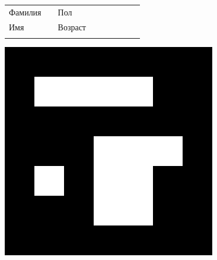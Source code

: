 \documentclass[12pt, a4paper]{article}
\begin{document}

\renewcommand{\arraystretch}{1.5}

\begin{figure}[t]
\scriptsize 
\begin{tabular}[b]{ V{2.8} m{2.0cm} V{2.8} m{6.2cm} V{2.8} m{2cm} V{2.8} m{5.85cm} V{2.8} } 
Фамилия &  & Пол & \\  [0.45cm]
Имя &  & Возраст & \\  [0.45cm]

\end{tabular}
\includegraphics[scale=0.16]{imgs/marker_2171}
\end{figure}

\setlength{\textfloatsep}{5pt plus 1.0pt minus 1.0pt}
\end{document}
